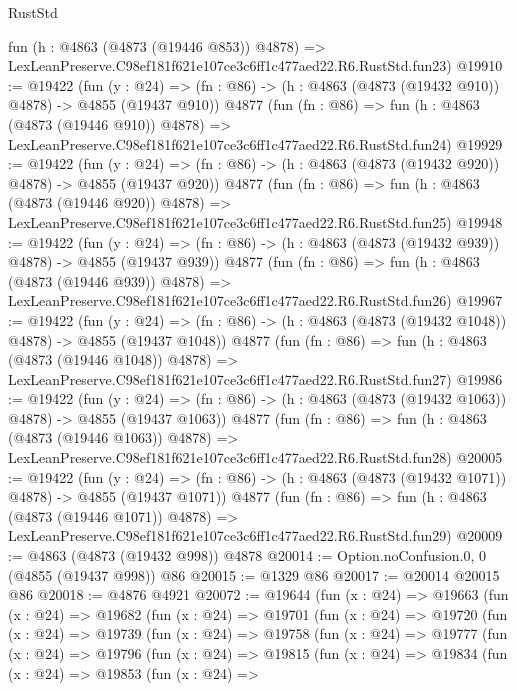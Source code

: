 \begin{lexlean}{RustStd}
\begin{coremodule}
    fun (h : @4863 (@4873 (@19446 @853)) @4878) =>
    LexLeanPreserve.C98ef181f621e107ce3c6ff1c477aed22.R6.RustStd.fun23)
@19910 := @19422
    (fun (y : @24) => (fn : @86) -> (h : @4863 (@4873 (@19432 @910)) @4878) -> @4855 (@19437 @910))
    @4877
    (fun (fn : @86) =>
    fun (h : @4863 (@4873 (@19446 @910)) @4878) =>
    LexLeanPreserve.C98ef181f621e107ce3c6ff1c477aed22.R6.RustStd.fun24)
@19929 := @19422
    (fun (y : @24) => (fn : @86) -> (h : @4863 (@4873 (@19432 @920)) @4878) -> @4855 (@19437 @920))
    @4877
    (fun (fn : @86) =>
    fun (h : @4863 (@4873 (@19446 @920)) @4878) =>
    LexLeanPreserve.C98ef181f621e107ce3c6ff1c477aed22.R6.RustStd.fun25)
@19948 := @19422
    (fun (y : @24) => (fn : @86) -> (h : @4863 (@4873 (@19432 @939)) @4878) -> @4855 (@19437 @939))
    @4877
    (fun (fn : @86) =>
    fun (h : @4863 (@4873 (@19446 @939)) @4878) =>
    LexLeanPreserve.C98ef181f621e107ce3c6ff1c477aed22.R6.RustStd.fun26)
@19967 := @19422
    (fun (y : @24) =>
    (fn : @86) -> (h : @4863 (@4873 (@19432 @1048)) @4878) -> @4855 (@19437 @1048))
    @4877
    (fun (fn : @86) =>
    fun (h : @4863 (@4873 (@19446 @1048)) @4878) =>
    LexLeanPreserve.C98ef181f621e107ce3c6ff1c477aed22.R6.RustStd.fun27)
@19986 := @19422
    (fun (y : @24) =>
    (fn : @86) -> (h : @4863 (@4873 (@19432 @1063)) @4878) -> @4855 (@19437 @1063))
    @4877
    (fun (fn : @86) =>
    fun (h : @4863 (@4873 (@19446 @1063)) @4878) =>
    LexLeanPreserve.C98ef181f621e107ce3c6ff1c477aed22.R6.RustStd.fun28)
@20005 := @19422
    (fun (y : @24) =>
    (fn : @86) -> (h : @4863 (@4873 (@19432 @1071)) @4878) -> @4855 (@19437 @1071))
    @4877
    (fun (fn : @86) =>
    fun (h : @4863 (@4873 (@19446 @1071)) @4878) =>
    LexLeanPreserve.C98ef181f621e107ce3c6ff1c477aed22.R6.RustStd.fun29)
@20009 := @4863 (@4873 (@19432 @998)) @4878
@20014 := Option.noConfusion.{0, 0} (@4855 (@19437 @998)) @86
@20015 := @1329 @86
@20017 := @20014 @20015 @86
@20018 := @4876 @4921
@20072 := @19644
    (fun (x : @24) =>
    @19663
      (fun (x : @24) =>
      @19682
        (fun (x : @24) =>
        @19701
          (fun (x : @24) =>
          @19720
            (fun (x : @24) =>
            @19739
              (fun (x : @24) =>
              @19758
                (fun (x : @24) =>
                @19777
                  (fun (x : @24) =>
                  @19796
                    (fun (x : @24) =>
                    @19815
                      (fun (x : @24) =>
                      @19834
                        (fun (x : @24) =>
                        @19853
                          (fun (x : @24) =>

\end{coremodule}
\end{lexlean}
